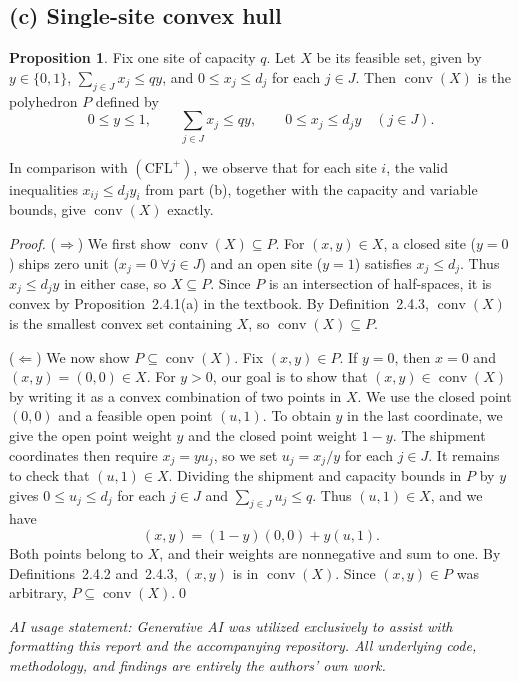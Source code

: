 \documentclass[11pt]{article}
\theoremstyle{definition}
\newtheorem{proposition}{Proposition}
\begin{document}
\subsection*{(c) Single-site convex hull}
\begin{proposition}
Fix one site of capacity $q$. Let $X$ be its feasible set, given by
$y\in\{0,1\}$, $\sum_{j\in J}x_j\le qy$, and $0\le x_j\le d_j$ for
each $j\in J$. Then $\operatorname{conv}(X)$ is the polyhedron $P$
defined by
\[
  0\le y\le 1,\qquad
  \sum_{j\in J}x_j\le qy,\qquad
  0\le x_j\le d_jy \quad (j\in J).
\]
\end{proposition}
In comparison with $(\mathrm{CFL}^+)$, we observe that for each site $i$, the valid inequalities $x_{ij}\le d_jy_i$ from part (b), together with the capacity and variable bounds, give $\operatorname{conv}(X)$ exactly.
\begin{proofbox}
\emph{Proof.}
($\Rightarrow$) We first show $\operatorname{conv}(X)\subseteq P$. For $(x,y)\in X$, a closed site ($y=0$) ships zero unit ($x_j = 0 \ \forall j \in J$) and an open site ($y=1$) satisfies $x_j\le d_j$. Thus $x_j\le d_jy$ in either case, so $X\subseteq P$. Since $P$ is an intersection of half-spaces, it is convex by Proposition~2.4.1(a) in the textbook. By
Definition~2.4.3, $\operatorname{conv}(X)$ is the smallest convex
set containing $X$, so $\operatorname{conv}(X)\subseteq P$.

($\Leftarrow$)
We now show $P\subseteq\operatorname{conv}(X)$. Fix $(x,y)\in P$. If $y=0$, then $x=0$ and
$(x,y)=(0,0)\in X$. For $y>0$, our goal is to show that $(x,y)\in\operatorname{conv}(X)$ by writing it as a convex combination of two points in $X$. We use the closed point $(0,0)$ and a feasible open point $(u,1)$. To obtain $y$ in the last coordinate, we give the open point weight $y$ and the closed point weight $1-y$. The shipment coordinates then require $x_j=yu_j$, so we set $u_j=x_j/y$ for each $j\in J$. It remains to check that $(u,1)\in X$. Dividing the shipment and capacity bounds in $P$ by $y$ gives $0\le u_j\le d_j$ for each
$j\in J$ and $\sum_{j\in J}u_j\le q$. Thus $(u,1)\in X$, and we have
\[
  (x,y)=(1-y)(0,0)+y(u,1).
\]
Both points belong to $X$, and their weights are nonnegative and
sum to one. By Definitions~2.4.2 and~2.4.3, $(x,y)$ is in
$\operatorname{conv}(X)$. Since $(x,y)\in P$ was arbitrary,
$P\subseteq\operatorname{conv}(X)$.\qed
\end{proofbox}
\small{\emph{AI usage statement: Generative AI was utilized exclusively to assist with formatting this report and the accompanying repository. All underlying code, methodology, and findings are entirely the authors' own work.}}
\end{document}
